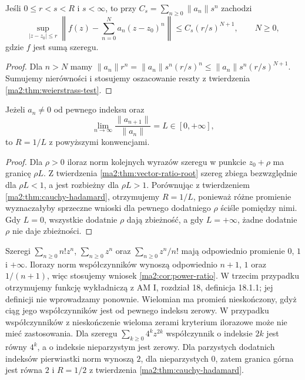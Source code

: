 \begin{wniosek}
\label{ma2:cor:power-remainder}
Jeśli $0\le r<s<R$ i $s<\infty$, to przy
$C_s=\sum_{n\ge0}\|a_n\|s^n$ zachodzi
\[
 \sup_{|z-z_0|\le r}
 \left\|f(z)-\sum_{n=0}^Na_n(z-z_0)^n\right\|
 \le C_s(r/s)^{N+1},\qquad N\ge0,
\]
gdzie $f$ jest sumą szeregu.
\end{wniosek}
\begin{proof}
Dla $n>N$ mamy
$\|a_n\|r^n=\|a_n\|s^n(r/s)^n
\le\|a_n\|s^n(r/s)^{N+1}$.
Sumujemy nierówności i stosujemy oszacowanie
reszty z twierdzenia \ref{ma2:thm:weierstrass-test}.
\end{proof}

\begin{wniosek}
\label{ma2:cor:power-ratio}
Jeżeli $a_n\ne0$ od pewnego indeksu oraz
\[
 \lim_{n\to\infty}\frac{\|a_{n+1}\|}{\|a_n\|}=L\in[0,+\infty],
\]
to $R=1/L$ z powyższymi konwencjami.
\end{wniosek}
\begin{proof}
Dla $\rho>0$ iloraz norm kolejnych wyrazów
szeregu w punkcie $z_0+\rho$ ma granicę $\rho L$.
Z twierdzenia \ref{ma2:thm:vector-ratio-root}
szereg zbiega bezwzględnie dla $\rho L<1$,
a jest rozbieżny dla $\rho L>1$.
Porównując z twierdzeniem
\ref{ma2:thm:cauchy-hadamard}, otrzymujemy
$R=1/L$, ponieważ różne promienie wyznaczałyby
sprzeczne wnioski dla pewnego dodatniego $\rho$
ściśle pomiędzy nimi. Gdy $L=0$, wszystkie
dodatnie $\rho$ dają zbieżność, a gdy $L=+\infty$,
żadne dodatnie $\rho$ nie daje zbieżności.
\end{proof}

\begin{przyklad}
\label{ma2:ex:power-radii}
Szeregi $\sum_{n\ge0}n!z^n$, $\sum_{n\ge0}z^n$
oraz $\sum_{n\ge0}z^n/n!$ mają odpowiednio
promienie $0$, $1$ i $+\infty$. Ilorazy norm
współczynników wynoszą odpowiednio $n+1$,
$1$ oraz $1/(n+1)$, więc stosujemy wniosek
\ref{ma2:cor:power-ratio}.
W trzecim przypadku otrzymujemy funkcję
wykładniczą z AM I, rozdział 18, definicja
18.1.1; jej definicji nie wprowadzamy ponownie.
Wielomian ma promień nieskończony, gdyż
ciąg jego współczynników jest od pewnego
indeksu zerowy.
W przypadku współczynników z nieskończenie
wieloma zerami kryterium ilorazowe może nie
mieć zastosowania. Dla szeregu
$\sum_{k\ge0}4^kz^{2k}$ współczynnik o indeksie
$2k$ jest równy $4^k$, a o indeksie nieparzystym
jest zerowy. Dla parzystych dodatnich indeksów
pierwiastki norm wynoszą $2$, dla nieparzystych
$0$, zatem granica górna jest równa $2$ i
$R=1/2$ z twierdzenia \ref{ma2:thm:cauchy-hadamard}.
\end{przyklad}

